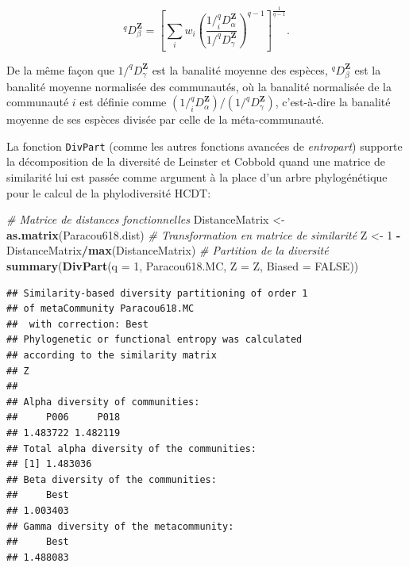 \documentclass[
  11pt,
  french,
  a4paper,
  extrafontsizes,onecolumn,openright
  ]{memoir}
\newenvironment{Shaded}{\begin{snugshade}}{\end{snugshade}}
\newcommand{\AttributeTok}[1]{\textcolor[rgb]{0.13,0.29,0.53}{#1}}
\newcommand{\CommentTok}[1]{\textcolor[rgb]{0.56,0.35,0.01}{\textit{#1}}}
\newcommand{\ConstantTok}[1]{\textcolor[rgb]{0.56,0.35,0.01}{#1}}
\newcommand{\DecValTok}[1]{\textcolor[rgb]{0.00,0.00,0.81}{#1}}
\newcommand{\FunctionTok}[1]{\textcolor[rgb]{0.13,0.29,0.53}{\textbf{#1}}}
\newcommand{\NormalTok}[1]{#1}
\newcommand{\OtherTok}[1]{\textcolor[rgb]{0.56,0.35,0.01}{#1}}
\newcommand{\SpecialCharTok}[1]{\textcolor[rgb]{0.81,0.36,0.00}{\textbf{#1}}}
\begin{document}
\begin{equation}
  \label{eq:Dbeta}
  ^q\!D^{\mathbf{Z}}_\beta
  ={\left[\sum_i{w_i}{\left(\frac{1/^q_i\!D^{\mathbf{Z}}_\alpha}{1/^q\!D^{\mathbf{Z}}_\gamma}\right)}^{q-1}\right]}^{\frac{1}{q-1}}.
\end{equation}

De la même façon que \(1/^q\!D^{\mathbf{Z}}_\gamma\) est la banalité moyenne des espèces, \(^q\!D^{\mathbf{Z}}_\beta\) est la banalité moyenne normalisée des communautés, où la banalité normalisée de la communauté \(i\) est définie comme \({\left(1/^q_i\!D^{\mathbf{Z}}_\alpha\right)}/{\left(1/^q\!D^{\mathbf{Z}}_\gamma\right)}\), c'est-à-dire la banalité moyenne de ses espèces divisée par celle de la méta-communauté.

La fonction \texttt{DivPart} (comme les autres fonctions avancées de \emph{entropart}) supporte la décomposition de la diversité de Leinster et Cobbold quand une matrice de similarité lui est passée comme argument à la place d'un arbre phylogénétique pour le calcul de la phylodiversité HCDT:

\scriptsize

\begin{Shaded}
\begin{Highlighting}[]
\CommentTok{\# Matrice de distances fonctionnelles}
\NormalTok{DistanceMatrix }\OtherTok{\textless{}{-}} \FunctionTok{as.matrix}\NormalTok{(Paracou618.dist)}
\CommentTok{\# Transformation en matrice de similarité}
\NormalTok{Z }\OtherTok{\textless{}{-}} \DecValTok{1} \SpecialCharTok{{-}}\NormalTok{ DistanceMatrix}\SpecialCharTok{/}\FunctionTok{max}\NormalTok{(DistanceMatrix)}
\CommentTok{\# Partition de la diversité}
\FunctionTok{summary}\NormalTok{(}\FunctionTok{DivPart}\NormalTok{(}\AttributeTok{q =} \DecValTok{1}\NormalTok{, Paracou618.MC, }\AttributeTok{Z =}\NormalTok{ Z, }\AttributeTok{Biased =} \ConstantTok{FALSE}\NormalTok{))}
\end{Highlighting}
\end{Shaded}

\begin{verbatim}
## Similarity-based diversity partitioning of order 1 
## of metaCommunity Paracou618.MC
##  with correction: Best
## Phylogenetic or functional entropy was calculated
## according to the similarity matrix 
## Z 
## 
## Alpha diversity of communities: 
##     P006     P018 
## 1.483722 1.482119 
## Total alpha diversity of the communities: 
## [1] 1.483036
## Beta diversity of the communities: 
##     Best 
## 1.003403 
## Gamma diversity of the metacommunity: 
##     Best 
## 1.488083
\end{verbatim}
\end{document}
